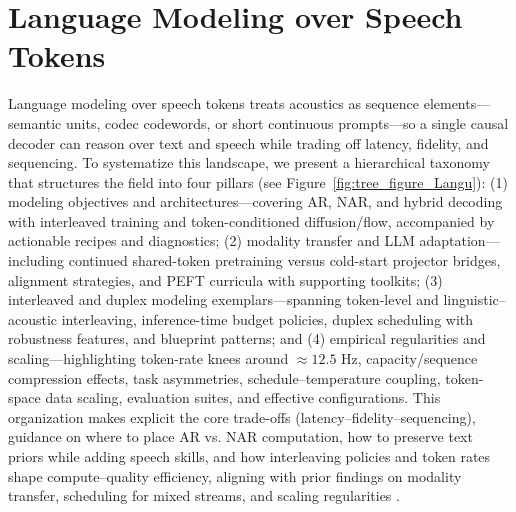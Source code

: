 \documentclass{article}
\begin{document}
\section{Language Modeling over Speech Tokens} \label{sec:Language Modeling over Speech Tokens}
Language modeling over speech tokens treats acoustics as sequence elements---semantic units, codec codewords, or short continuous prompts---so a single causal decoder can reason over text and speech while trading off latency, fidelity, and sequencing. To systematize this landscape, we present a hierarchical taxonomy that structures the field into four pillars (see Figure~\ref{fig:tree_figure_Langu}): (1) modeling objectives and architectures---covering AR, NAR, and hybrid decoding with interleaved training and token-conditioned diffusion/flow, accompanied by actionable recipes and diagnostics; (2) modality transfer and LLM adaptation---including continued shared-token pretraining versus cold-start projector bridges, alignment strategies, and PEFT curricula with supporting toolkits; (3) interleaved and duplex modeling exemplars---spanning token-level and linguistic--acoustic interleaving, inference-time budget policies, duplex scheduling with robustness features, and blueprint patterns; and (4) empirical regularities and scaling---highlighting token-rate knees around $\approx 12.5$ Hz, capacity/sequence compression effects, task asymmetries, schedule--temperature coupling, token-space data scaling, evaluation suites, and effective configurations. This organization makes explicit the core trade-offs (latency--fidelity--sequencing), guidance on where to place AR vs. NAR computation, how to preserve text priors while adding speech skills, and how interleaving policies and token rates shape compute--quality efficiency, aligning with prior findings on modality transfer, scheduling for mixed streams, and scaling regularities \cite{zeng2024scalingspeechtextpretrainingsyntheticint,wang2025tadicodectextawarediffusionspeechtokeniz}.

\end{document}
